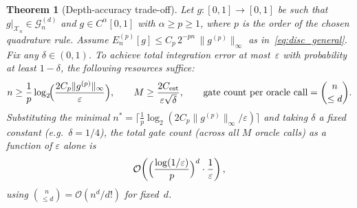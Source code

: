 \documentclass[12pt,a4paper]{article}
\theoremstyle{plain}
\newtheorem{theorem}{Theorem}[section]
\theoremstyle{definition}
\theoremstyle{remark}
\newcommand{\Gclass}[2]{\mathcal{G}_{#1}^{(#2)}}
\begin{document}
\begin{theorem}[Depth-accuracy trade-off]
\label{thm:pareto}
Let $g:[0,1]\to[0,1]$ be such that $g|_{\mathcal{X}_n}\in\Gclass{n}{d}$
and $g\in C^\alpha[0,1]$ with $\alpha\geq p\geq 1$, where $p$ is the
order of the chosen quadrature rule.
Assume $E_n^{(p)}[g]\leq C_p\,2^{-pn}\,\|g^{(p)}\|_\infty$
as in~\eqref{eq:disc_general}.
Fix any $\delta\in(0,1)$.
To achieve total integration error at most~$\varepsilon$ with
probability at least $1-\delta$, the following resources suffice:
\begin{equation}
  n \geq \frac{1}{p}\log_2\!\Bigl(\frac{2C_p\|g^{(p)}\|_\infty}{\varepsilon}\Bigr),
  \qquad
  M \geq \frac{2C_{\mathrm{est}}}{\varepsilon\sqrt{\delta}},
  \qquad
  \text{gate count per oracle call}= \binom{n}{\leq d}.
  \label{eq:pareto_resources}
\end{equation}
Substituting the minimal $n^*=\lceil\frac{1}{p}\log_2(2C_p\|g^{(p)}\|_\infty/\varepsilon)\rceil$
and taking $\delta$ a fixed constant (e.g.\ $\delta=1/4$),
the \emph{total} gate count (across all $M$ oracle calls) as a function
of $\varepsilon$ alone is
\begin{equation}
  \mathcal{O}\!\left(
    \Bigl(\frac{\log(1/\varepsilon)}{p}\Bigr)^d
    \cdot \frac{1}{\varepsilon}
  \right),
  \label{eq:total_gates_eps}
\end{equation}
using $\binom{n}{\leq d}=\mathcal{O}(n^d/d!)$ for fixed~$d$.
\end{theorem}
\end{document}
